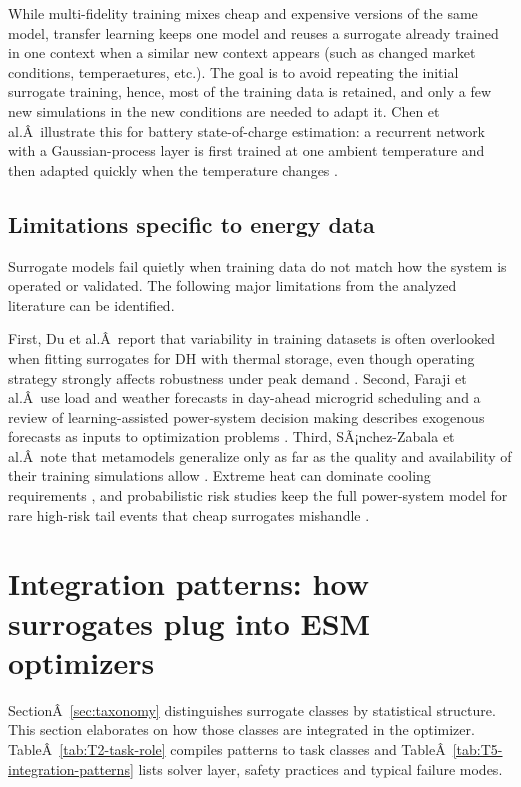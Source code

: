 \documentclass[final,5p,times,twocolumn]{elsarticle}
\begin{document}
While multi-fidelity training mixes cheap and expensive versions of the
same model, transfer learning keeps one model and reuses a surrogate
already trained in one context when a similar new context appears (such
as changed market conditions, temperaetures, etc.). The goal is to avoid
repeating the initial surrogate training, hence, most of the training
data is retained, and only a few new simulations in the new conditions
are needed to adapt it. Chen et al.Â~illustrate this for battery
state-of-charge estimation: a recurrent network with a Gaussian-process
layer is first trained at one ambient temperature and then adapted
quickly when the temperature changes \cite{Chen202514792}.

\subsection{Limitations specific to energy data}
\label{sec:doe:pitfalls}

Surrogate models fail quietly when training data do not match how the
system is operated or validated. The following major limitations from
the analyzed literature can be identified.

First, Du et al.Â~report that variability in training datasets is often
overlooked when fitting surrogates for DH with thermal storage, even
though operating strategy strongly affects robustness under peak demand
\cite{Du2025}. Second, Faraji et al.Â~use load and weather forecasts in
day-ahead microgrid scheduling \cite{Faraji2020157284} and a review of
learning-assisted power-system decision making describes exogenous
forecasts as inputs to optimization problems \cite{Lim2025}. Third,
SÃ¡nchez-Zabala et al.Â~note that metamodels generalize only as far as the
quality and availability of their training simulations allow
\cite{Sánchez-Zabala2024}. Extreme heat can dominate cooling requirements
\cite{Morakinyo201973}, and probabilistic risk studies keep the full
power-system model for rare high-risk tail events that cheap surrogates
mishandle \cite{Xu20203127}.

\section{Integration patterns: how surrogates plug into ESM optimizers}
\label{sec:integration}

SectionÂ~\ref{sec:taxonomy} distinguishes surrogate classes by statistical
structure. This section elaborates on how those classes are integrated
in the optimizer.
TableÂ~\ref{tab:T2-task-role} compiles patterns to task classes and
TableÂ~\ref{tab:T5-integration-patterns} lists solver layer, safety
practices and typical failure modes.
\end{document}
